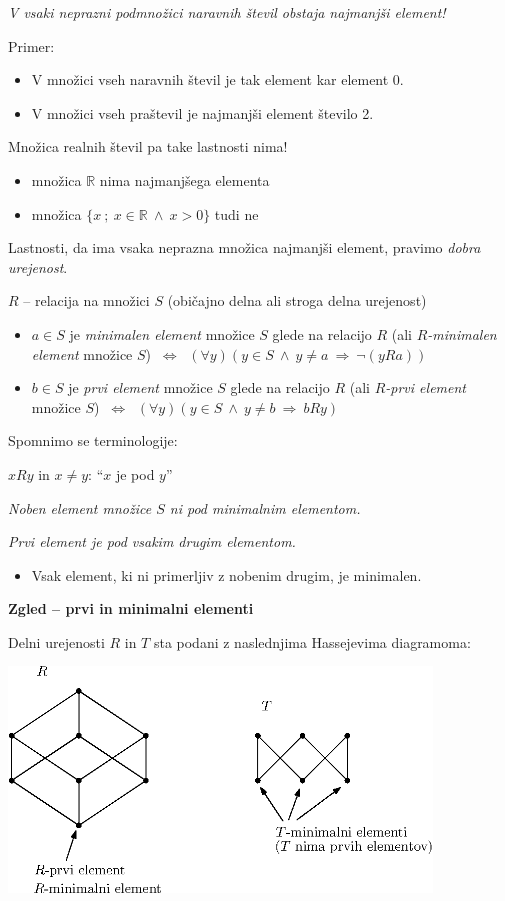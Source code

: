 \documentclass[11pt,paper=b5,footinclude,headinclude]{scrbook} %
\def\inn {{~\wedge~}}
\def\sledi {{~\Rightarrow~}}
\def\cee {{~\Leftrightarrow~}}
\begin{document}
{\em V vsaki neprazni podmnožici naravnih števil obstaja najmanjši element!}

Primer:
\begin{itemize}
  \item V množici vseh naravnih števil je tak element kar element 0.
  \item V množici vseh praštevil je najmanjši element število 2.
\end{itemize}
Množica realnih števil pa take lastnosti nima!
\begin{itemize}
  \item množica $\mathbb{R}$ nima najmanjšega elementa
  \item množica $\{x~;~x\in \mathbb{R} \inn x> 0\}$ tudi ne
\end{itemize}

\bigskip
Lastnosti, da ima vsaka neprazna množica najmanjši element, pravimo {\em dobra urejenost}.

\bigskip
$R$ -- relacija na množici $S$ (običajno delna ali stroga delna urejenost)
\begin{itemize}
  \item $a\in S$ je {\em minimalen element} množice $S$ glede na relacijo $R$ (ali {\em $R$-minimalen element} množice $S$) $\cee$ $(\forall y)(y\in S\inn y\neq a\sledi \neg (yRa))$
  \item $b\in S$ je {\em prvi element} množice $S$ glede na relacijo $R$ (ali {\em $R$-prvi element} množice $S$) $\cee$ $(\forall y)(y\in S\inn y\neq b\sledi bRy)$
\end{itemize}

\bigskip
Spomnimo se terminologije:

$xRy$ in $x\neq y$: ``$x$ je pod $y$''

\medskip
\emph{Noben element množice $S$ ni pod minimalnim elementom.}

\emph{Prvi element je pod vsakim drugim elementom.}

\begin{itemize}
  \item Vsak element, ki ni primerljiv z nobenim drugim, je minimalen.
\end{itemize}

\bigskip
\textbf{Zgled -- prvi in minimalni elementi}

Delni urejenosti $R$ in $T$ sta podani z naslednjima Hassejevima diagramoma:

\begin{center}
\includegraphics[height=60mm]{Hasse2.eps}
\end{center}
\end{document}
